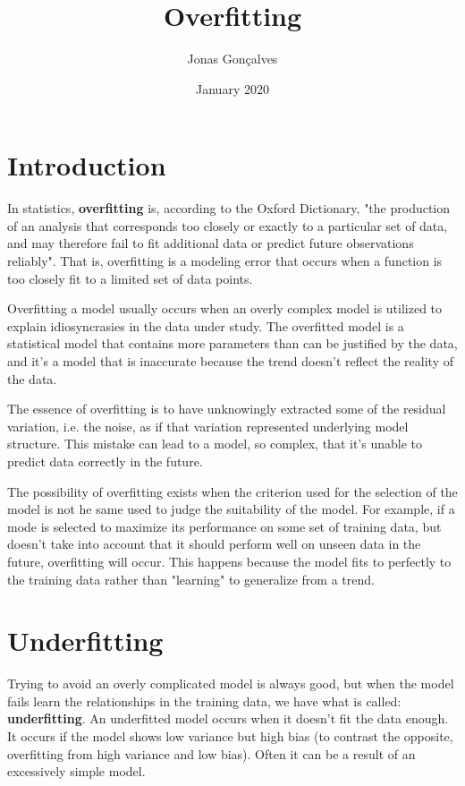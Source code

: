 \documentclass{article}
\title{Overfitting}
\author{Jonas Gonçalves}
\date{January 2020}
\begin{document}
\maketitle

\section{Introduction}

    In statistics, \textbf{overfitting}  is, according to the Oxford Dictionary, "the production of an analysis that corresponds too closely or exactly to a particular set of data, and may therefore fail to fit additional data or predict future observations reliably". That is, overfitting is a modeling error that occurs when a function is too closely fit to a limited set of data points.
    
    Overfitting a model usually occurs when an overly complex model is utilized to explain idiosyncrasies in the data under study. The overfitted model is a statistical model that contains more parameters than can be justified by the data, and it's a model that is inaccurate because the trend doesn't reflect the reality of the data.
    
    The essence of overfitting is to have unknowingly extracted some of the residual variation, i.e. the noise, as if that variation represented underlying model structure. This mistake can lead to a model, so complex, that it's unable to predict data correctly in the future.
    
    The possibility of overfitting exists when the criterion used for the selection of the model is not he same used to judge the suitability of the model. For example, if a mode is selected to maximize its performance on some set of training data, but doesn't take into account that it should perform well on unseen data in the future, overfitting will occur. This happens because the model fits to perfectly to the training data rather than "learning" to generalize from a trend.


\section{Underfitting}
    
    Trying to avoid an overly complicated model is always good, but when the model fails learn the relationships in the training data, we have what is called: \textbf{underfitting}. An underfitted model occurs when it doesn't fit the data enough. It occurs if the model shows low variance but high bias (to contrast the opposite, overfitting from high variance and low bias). Often it can be a result of an excessively simple model.
\end{document}
